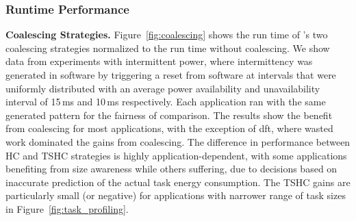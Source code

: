 
\subsubsection{\sys Runtime Performance}
\label{sec:result_coalescing}

\textbf{Coalescing Strategies.} Figure~\ref{fig:coalescing} shows the run time
of \sys's two coalescing strategies normalized to the run time without
coalescing. We show data from experiments with intermittent power, where intermittency was generated in software
by triggering a reset from software at intervals that were uniformly distributed with an average power availability and unavailability interval of 15\,ms and 10\,ms respectively. Each application ran with the same generated pattern for the fairness of comparison. 
%
The results show the benefit from coalescing for most applications, with the
exception of dft, where wasted work dominated the gains from coalescing.
The difference in performance between HC and TSHC strategies is highly
application-dependent, with some applications benefiting from size awareness
while others suffering, due to decisions based on inaccurate prediction of the
actual task energy consumption.
The TSHC gains are particularly small (or negative) for applications with
narrower range of task sizes in Figure~\ref{fig:task_profiling}.

